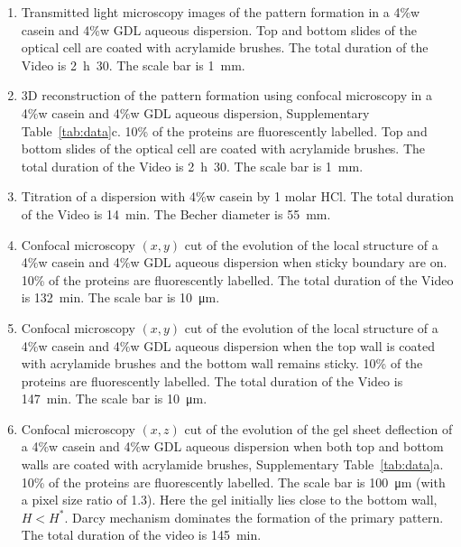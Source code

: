 \documentclass[twocolumn,superscriptaddress,showpacs,preprintnumbers,
amsmath,amssymb,prl]{revtex4-1}
\begin{document}
\begin{enumerate}
\renewcommand{\labelenumi}{\textbf{Video \arabic{enumi}:}}
\itemindent 8mm
\item\label{vid:transmitted} Transmitted light microscopy images of the pattern formation in a 4\%w casein and 4\%w GDL aqueous dispersion. Top and bottom slides of the optical cell are coated with acrylamide brushes. The total duration of the Video is \SI{2}{\hour}~30. The scale bar is \SI{1}{\milli\metre}.

\item\label{vid:reconstructed} 3D reconstruction of the pattern formation using confocal microscopy in a 4\%w casein and 4\%w GDL aqueous dispersion, Supplementary Table~\ref{tab:data}c. 10\% of the proteins are fluorescently labelled. Top and bottom slides of the optical cell are coated with acrylamide brushes. The total duration of the Video is \SI{2}{\hour}~30. The scale bar is \SI{1}{\milli\metre}.




\item\label{vid:titration} Titration of a dispersion with 4\%w casein by 1 molar HCl. The total duration of the Video is \SI{14}{\minute}. The Becher diameter is \SI{55}{\milli\metre}.


\item\label{vid:stick63} Confocal microscopy $(x,y)$ cut of the evolution of the local structure of a 4\%w casein and 4\%w GDL aqueous dispersion when sticky boundary are on. 10\% of the proteins are fluorescently labelled. The total duration of the Video is \SI{132}{\minute}. The scale bar is \SI{10}{\micro\metre}.

\item\label{vid:nostick63} Confocal microscopy $(x,y)$ cut of the evolution of the local structure of a 4\%w casein and 4\%w GDL aqueous dispersion when the top wall is coated with acrylamide brushes and the bottom wall remains sticky. 10\% of the proteins are fluorescently labelled. The total duration of the Video is \SI{147}{\minute}. The scale bar is \SI{10}{\micro\metre}.

\item\label{vid:cutDarcy} Confocal microscopy $(x,z)$ cut of the evolution of the gel sheet deflection of a 4\%w casein and 4\%w GDL aqueous dispersion when both top and bottom walls are coated with acrylamide brushes, Supplementary Table~\ref{tab:data}a. 10\% of the proteins are fluorescently labelled. The scale bar is \SI{100}{\micro\metre} (with a pixel size ratio of 1.3). Here the gel initially lies close to the bottom wall, $H<H^*$. Darcy mechanism dominates the formation of the primary pattern. The total duration of the video is \SI{145}{\minute}.


\end{enumerate}
\end{document}

